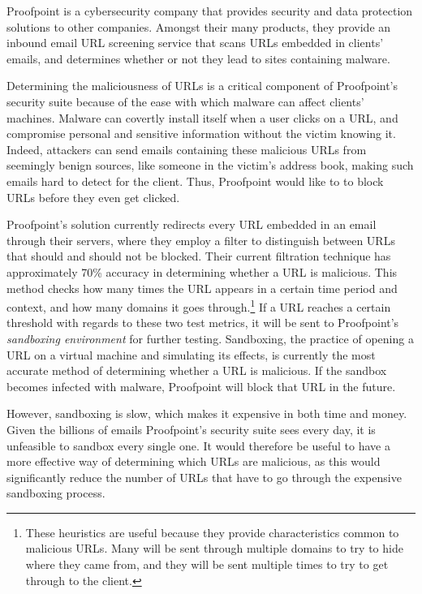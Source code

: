 \documentclass[cs,proposal]{hmcclinic}
\begin{document}
Proofpoint is a cybersecurity company that provides security and data protection solutions to other companies. Amongst their many products, they provide an inbound email URL screening service that scans URLs embedded in clients' emails, and determines whether or not they lead to sites containing malware.

Determining the maliciousness of URLs is a critical component of Proofpoint's security suite because of the ease with which malware can affect clients' machines. Malware can covertly install itself when a user clicks on a URL, and compromise personal and sensitive information without the victim knowing it. Indeed, attackers can send emails containing these malicious URLs from seemingly benign sources, like someone in the victim's address book, making such emails hard to detect for the client. Thus, Proofpoint would like to to block URLs before they even get clicked.

Proofpoint's solution currently redirects every URL embedded in an email through their servers, where they employ a filter to distinguish between URLs that should and should not be blocked. Their current filtration technique has approximately 70\% accuracy in determining whether a URL is malicious. This method checks how many times the URL appears in a certain time period and context, and how many domains it goes through.\footnote{These heuristics are useful because they provide characteristics common to malicious URLs. Many will be sent through multiple domains to try to hide where they came from, and they will be sent multiple times to try to get through to the client.} If a URL reaches a certain threshold with regards to these two test metrics, it will be sent to Proofpoint's \textit{sandboxing environment} for further testing. Sandboxing, the practice of opening a URL on a virtual machine and simulating its effects, is currently the most accurate method of determining whether a URL is malicious. If the sandbox becomes infected with malware, Proofpoint will block that URL in the future.

However, sandboxing is slow, which makes it expensive in both time and money. Given the billions of emails Proofpoint's security suite sees every day, it is unfeasible to sandbox every single one. It would therefore be useful to have a more effective way of determining which URLs are malicious, as this would significantly reduce the number of URLs that have to go through the expensive sandboxing process.
\end{document}
